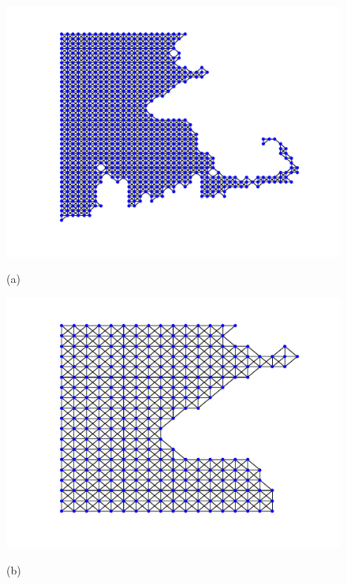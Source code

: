 \documentclass[journal, 10pt]{IEEEtran}
\begin{document}
\begin{figure}[tb] 
\begin{minipage}[m]{0.24\linewidth}
\centerline{\includegraphics[width=.9\linewidth]{fig_temp_graph_structure}}
\vspace{-.2in}
\centerline{\small{(a)}}
\end{minipage}
\begin{minipage}[m]{0.24\linewidth}
\centerline{\includegraphics[width=.9\linewidth]{fig_temp_structure_bos}}
\vspace{-.2in}
\centerline{\small{(b)}}
\end{minipage} %
\begin{minipage}[m]{0.24\linewidth}

\end{minipage}
\end{figure}
\end{document}
